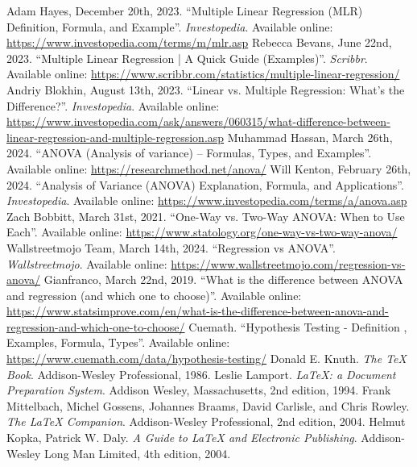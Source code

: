\documentclass[a4paper]{article}
\begin{document}
	\begin{thebibliography}{99}
		 Adam Hayes, December 20th, 2023. “Multiple Linear Regression (MLR) Definition, Formula, and Example”. \textit{Investopedia}. Available online: \url{https://www.investopedia.com/terms/m/mlr.asp}
		 Rebecca Bevans, June 22nd, 2023. “Multiple Linear Regression | A Quick Guide (Examples)”. \textit{Scribbr}. Available online: \url{https://www.scribbr.com/statistics/multiple-linear-regression/}
		 Andriy Blokhin, August 13th, 2023. “Linear vs. Multiple Regression: What's the Difference?”. \textit{Investopedia}. Available online: \url{https://www.investopedia.com/ask/answers/060315/what-difference-between-linear-regression-and-multiple-regression.asp}
		 Muhammad Hassan, March 26th, 2024. “ANOVA (Analysis of variance) – Formulas, Types, and Examples”. Available online: \url{https://researchmethod.net/anova/}
		 Will Kenton, February 26th, 2024. “Analysis of Variance (ANOVA) Explanation, Formula, and Applications”. \textit{Investopedia}. Available online: \url{https://www.investopedia.com/terms/a/anova.asp}
		 Zach Bobbitt, March 31st, 2021. “One-Way vs. Two-Way ANOVA: When to Use Each”. Available online: \url{https://www.statology.org/one-way-vs-two-way-anova/}
		 Wallstreetmojo Team, March 14th, 2024. “Regression vs ANOVA”. \textit{Wallstreetmojo}. Available online: \url{https://www.wallstreetmojo.com/regression-vs-anova/}
		 Gianfranco, March 22nd, 2019. “What is the difference between ANOVA and regression (and which one to choose)”. Available online: \url{https://www.statsimprove.com/en/what-is-the-difference-between-anova-and-regression-and-which-one-to-choose/}
		 Cuemath. “Hypothesis Testing - Definition , Examples, Formula, Types”. Available online: \url{https://www.cuemath.com/data/hypothesis-testing/}
		 Donald E. Knuth. \textit{The \TeX{} Book}. Addison-Wesley Professional, 1986.
		 Leslie Lamport. \textit{\LaTeX{}: a Document Preparation System}. Addison Wesley, Massachusetts, 2nd edition, 1994.
		 Frank Mittelbach, Michel Gossens, Johannes Braams, David Carlisle, and Chris Rowley. \textit{The \LaTeX{} Companion}. Addison-Wesley Professional, 2nd edition, 2004.
		 Helmut Kopka, Patrick W. Daly. \textit{A Guide to \LaTeX{} and Electronic Publishing}. Addison-Wesley Long Man Limited, 4th edition, 2004.
	\end{thebibliography}
	
		
		
	
\end{document}
